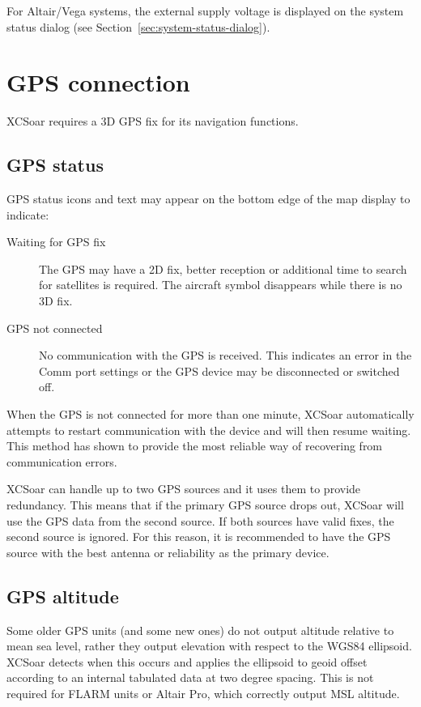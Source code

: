 \documentclass[a4paper,12pt]{refrep}
\begin{document}
For Altair/Vega systems, the external supply voltage is displayed on
the system status dialog (see Section~\ref{sec:system-status-dialog}).

\section{GPS connection}

XCSoar requires a 3D GPS fix for its navigation functions.

\subsection*{GPS status}

GPS status icons and text may appear on the bottom edge of the
map display to indicate:
\begin{description}
\item[Waiting for GPS fix]  The GPS may have a 2D fix, better reception
  or additional time to search for satellites is required.
  The aircraft symbol disappears while there is no 3D fix.
\item[GPS not connected]  No communication with the GPS is received.
  This indicates an error in the Comm port settings or the GPS device may
  be disconnected or switched off.
\end{description}

When the GPS is not connected for more than one minute, XCSoar
automatically attempts to restart communication with the device and
will then resume waiting.  This method has shown to provide the most
reliable way of recovering from communication errors.

XCSoar can handle up to two GPS sources and it uses them to provide
redundancy.  This means that if the primary GPS source drops out,
XCSoar will use the GPS data from the second source.  If both sources
have valid fixes, the second source is ignored.  For this reason, it
is recommended to have the GPS source with the best antenna or
reliability as the primary device.

\subsection*{GPS altitude}

Some older GPS units (and some new ones) do not output altitude
relative to mean sea level, rather they output elevation with respect
to the WGS84 ellipsoid.  XCSoar detects when this occurs and applies
the ellipsoid to geoid offset according to an internal tabulated data
at two degree spacing.  This is not required for FLARM units or Altair
Pro, which correctly output MSL altitude.
\end{document}
